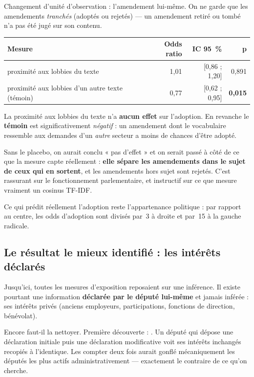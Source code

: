 \documentclass[11pt,a4paper]{article}
\begin{document}
Changement d'unité d'observation : l'amendement lui-même. On ne garde que les
 amendements \emph{tranchés} (adoptés ou rejetés) --- un amendement retiré
ou tombé n'a pas été jugé sur son contenu.

\begin{center}
\small
\begin{tabular}{@{}lrrr@{}}
\toprule
\textbf{Mesure} & \textbf{Odds ratio} & \textbf{IC 95~\%} & \textbf{p} \\
\midrule
proximité aux lobbies du texte & 1,01 & [0,86 ; 1,20] & 0,891 \\
proximité aux lobbies d'un autre texte (témoin) & 0,77 & [0,62 ; 0,95] & \textbf{0,015} \\
\bottomrule
\end{tabular}
\end{center}

\begin{bon}
La proximité aux lobbies du texte n'a \textbf{aucun effet} sur l'adoption. En revanche le
\textbf{témoin} est significativement \emph{négatif} : un amendement dont le vocabulaire
ressemble aux demandes d'un \emph{autre} secteur a moins de chances d'être adopté.

Sans le placebo, on aurait conclu « pas d'effet » et on serait passé à côté de ce que la
mesure capte réellement : \textbf{elle sépare les amendements dans le sujet de ceux qui en
sortent}, et les amendements hors sujet sont rejetés. C'est rassurant sur le fonctionnement
parlementaire, et instructif sur ce que mesure vraiment un cosinus TF-IDF.
\end{bon}

Ce qui prédit réellement l'adoption reste l'appartenance politique : par rapport au centre,
les odds d'adoption sont divisés par~3 à droite et par~15 à la gauche radicale.

\subsection{Le résultat le mieux identifié : les intérêts déclarés}

Jusqu'ici, toutes les mesures d'exposition reposaient sur une inférence. Il existe pourtant
une information \textbf{déclarée par le député lui-même} et jamais inférée : ses intérêts
privés (anciens employeurs, participations, fonctions de direction, bénévolat).

Encore faut-il la nettoyer. Première découverte : . Un député qui
dépose une déclaration initiale puis une déclaration modificative voit ses intérêts
inchangés recopiés à l'identique. Les compter deux fois aurait gonflé mécaniquement les
députés les plus actifs administrativement --- exactement le contraire de ce qu'on cherche.
\end{document}
